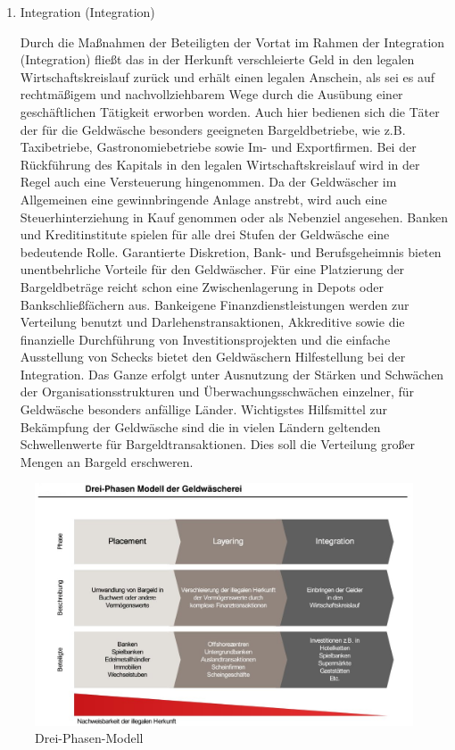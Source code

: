 \documentclass{article}
\begin{document}
\begin{enumerate}
                    \item Integration (Integration)

                        Durch die Maßnahmen der Beteiligten der Vortat im Rahmen der Integration (Integration) fließt das in der Herkunft verschleierte Geld in den legalen Wirtschaftskreislauf zurück und erhält einen legalen Anschein, als sei es auf rechtmäßigem und nachvollziehbarem Wege durch die Ausübung einer geschäftlichen Tätigkeit erworben worden. Auch hier bedienen sich die Täter der für die Geldwäsche besonders geeigneten Bargeldbetriebe, wie z.B. Taxibetriebe, Gastronomiebetriebe sowie Im- und Exportfirmen.
                            Bei der Rückführung des Kapitals in den legalen Wirtschaftskreislauf wird in der Regel auch eine    Versteuerung hingenommen. Da der Geldwäscher im Allgemeinen eine gewinnbringende    Anlage anstrebt, wird auch eine Steuerhinterziehung in Kauf genommen oder als Nebenziel     angesehen.
                        Banken und Kreditinstitute spielen für alle drei Stufen der Geldwäsche eine bedeutende Rolle. Garantierte Diskretion, Bank- und Berufsgeheimnis bieten unentbehrliche Vorteile für den Geldwäscher. Für eine Platzierung der Bargeldbeträge reicht schon eine Zwischenlagerung in Depots oder Bankschließfächern aus. Bankeigene Finanzdienstleistungen werden zur Verteilung benutzt und Darlehenstransaktionen, Akkreditive sowie die finanzielle Durchführung von Investitionsprojekten und die einfache Ausstellung von Schecks bietet den Geldwäschern Hilfestellung bei der Integration. Das Ganze erfolgt unter Ausnutzung der Stärken und Schwächen der Organisationsstrukturen und Überwachungsschwächen einzelner, für Geldwäsche besonders anfällige Länder.
                        Wichtigstes Hilfsmittel zur Bekämpfung der Geldwäsche sind die in vielen Ländern geltenden Schwellenwerte für Bargeldtransaktionen. Dies soll die Verteilung großer Mengen an Bargeld erschweren.

                \end{enumerate}
               
                \begin{figure}
                    \centering
                  \includegraphics[scale=0.3]{../../turandon/data/drei_phasen_modell.png}
                    \caption{Drei-Phasen-Modell}
                    \label{fig2}
                \end{figure}
\end{document}
